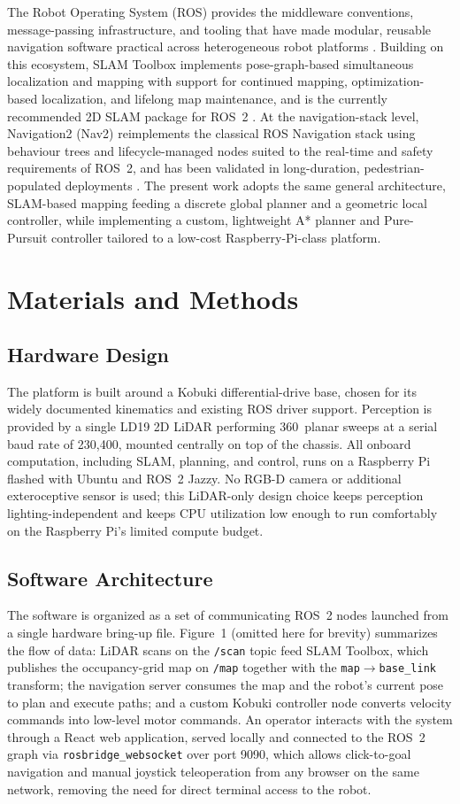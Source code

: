 \documentclass[10pt,twocolumn]{article}
\begin{document}
The Robot Operating System (ROS) provides the middleware conventions, message-passing infrastructure, and tooling that have made modular, reusable navigation software practical across heterogeneous robot platforms \cite{quigley2009}. Building on this ecosystem, SLAM Toolbox implements pose-graph-based simultaneous localization and mapping with support for continued mapping, optimization-based localization, and lifelong map maintenance, and is the currently recommended 2D SLAM package for ROS~2 \cite{macenski2021slam}. At the navigation-stack level, Navigation2 (Nav2) reimplements the classical ROS Navigation stack using behaviour trees and lifecycle-managed nodes suited to the real-time and safety requirements of ROS~2, and has been validated in long-duration, pedestrian-populated deployments \cite{macenski2020nav2}. The present work adopts the same general architecture, SLAM-based mapping feeding a discrete global planner and a geometric local controller, while implementing a custom, lightweight A* planner and Pure-Pursuit controller tailored to a low-cost Raspberry-Pi-class platform.

\section{Materials and Methods}

\subsection{Hardware Design}
The platform is built around a Kobuki differential-drive base, chosen for its widely documented kinematics and existing ROS driver support. Perception is provided by a single LD19 2D LiDAR performing 360\textdegree\ planar sweeps at a serial baud rate of 230{,}400, mounted centrally on top of the chassis. All onboard computation, including SLAM, planning, and control, runs on a Raspberry Pi flashed with Ubuntu and ROS~2 Jazzy. No RGB-D camera or additional exteroceptive sensor is used; this LiDAR-only design choice keeps perception lighting-independent and keeps CPU utilization low enough to run comfortably on the Raspberry Pi's limited compute budget.

\subsection{Software Architecture}
The software is organized as a set of communicating ROS~2 nodes launched from a single hardware bring-up file. Figure~1 (omitted here for brevity) summarizes the flow of data: LiDAR scans on the \texttt{/scan} topic feed SLAM Toolbox, which publishes the occupancy-grid map on \texttt{/map} together with the \texttt{map}$\rightarrow$\texttt{base\_link} transform; the navigation server consumes the map and the robot's current pose to plan and execute paths; and a custom Kobuki controller node converts velocity commands into low-level motor commands. An operator interacts with the system through a React web application, served locally and connected to the ROS~2 graph via \texttt{rosbridge\_websocket} over port 9090, which allows click-to-goal navigation and manual joystick teleoperation from any browser on the same network, removing the need for direct terminal access to the robot.
\end{document}
